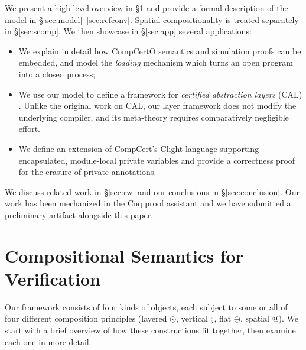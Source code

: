 \documentclass[acmsmall,screen,review,anonymous,nonacm]{acmart}
\begin{document}
We present a high-level overview in \S\ref{sec:overview}
and provide a formal description of the model in \S\ref{sec:model}--\ref{sec:refconv}.
Spatial compositionality is treated separately in \S\ref{sec:scomp}.
We then showcase in \S\ref{sec:app} several applications:
\begin{itemize}
  \item We explain in detail how
    CompCertO semantics and simulation proofs can be embedded,
    and model the \emph{loading} mechanism
    which turns an open program into a closed process;
  \item We use our model to define a framework for
    \emph{certified abstraction layers} (CAL) \cite{popl15}.
    Unlike the original work on CAL,
    our layer framework does not modify the underlying compiler,
    and its meta-theory requires comparatively negligible effort.
  \item We define an extension of CompCert's Clight language
    supporting encapsulated, module-local private variables
    and provide a correctness proof for the erasure of private annotations.
\end{itemize}
We discuss related work in \S\ref{sec:rw}
and our conclusions in \S\ref{sec:conclusion}.
Our work has been mechanized in the Coq proof assistant
and we have submitted a preliminary artifact alongside this paper.



\section{Compositional Semantics for Verification} \label{sec:overview} %

Our framework consists of four kinds of objects,
each subject to some or all of four
different composition principles
(layered $\odot$,
 vertical $\fatsemi$,
 flat $\oplus$,
 spatial $\mathbin@$).
We start with a brief overview of how these constructions fit together,
then examine each one in more detail.
\end{document}
